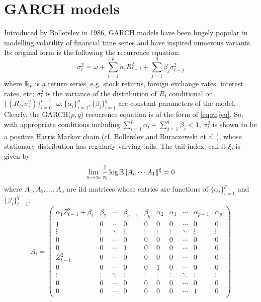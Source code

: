 
\section{GARCH models}
Introduced by Bollerslev in 1986, GARCH models have been hugely
popular in modelling volatility of financial time series and have
inspired numerous variants. Its original form is the following the
recurrence equation:
\[
\sigma_t^2 = \omega + \sum_{i=1}^p \alpha_i R_{t-i}^2 +
\sum_{j=1}^q \beta_j \sigma_{t-j}^2
\]
where $\mathbb{R}_t$ is a return series, e.g. stock returns, foreign exchange
rates, interest rates, etc; $\sigma_t^2$ is the variance of the
distribution of $R_t$ conditional on $\{(R_i,
\sigma_i^2)\}_{i=0}^{t-1}$. $\omega, \{\alpha_i\}_{i=1}^p,
\{\beta_i\}_{i=1}^q$ are constant parameters of the model. Clearly,
the GARCH($p,q$) recurrence equation is of the form of
\eqref{eq:rhjyu}. So, with appropriate conditions including
$\sum_{i=1}^p \alpha_i + \sum_{j=1}^q \beta_j < 1$, $\sigma_t^2$ is
shown to be a positive Harris Markov chain (cf. Bollerslev
\cite{bollerslev:1986} and Buraczewski et al
\cite{buraczewski:damek:mikosch:2016}), whose stationary distribution
has regularly varying tails. The tail index, call it $\xi$, is given by
\[
\lim_{n \to \infty} {1 \over n}\log\mathbb{E}\|A_n \cdots A_1\|^\xi = 0
\]
where $A_1, A_2, \dots, A_n$ are iid matrices whose entries are
functions of $\{\alpha_i\}_{i=1}^p$ and $\{\beta_i\}_{i=1}^q$:
\[
A_i =
\begin{pmatrix}
  \alpha_1 Z_{t-1}^2 + \beta_1 & \beta_2 & \cdots &
  \beta_{q-1} & \beta_q & \alpha_2 & \alpha_3 &
  \cdots & \alpha_{p-1} & \alpha_p\\
  1 & 0 & \cdots & 
  0 & 0 & 0 & 0 & \cdots & 0 & 0 \\
  \vdots & \vdots & \ddots & 
  \vdots & \vdots & \vdots & \vdots &
  \ddots & \vdots & \vdots \\
  0 & 0 & \cdots &
  0 & 0 & 0 & 0 & \cdots & 0 & 0 \\
  0 & 0 & \cdots &
  1 & 0 & 0 & 0 & \cdots & 0 & 0 \\
  Z_{t-1}^2 & 0 & \cdots &
  0 & 0 & 0 & 0 & \cdots & 0 & 0 \\
  0 & 0 & \cdots &
  0 & 0 & 1 & 0 & \cdots & 0 & 0 \\
  \vdots & \vdots & \ddots &
  \vdots & \vdots & \vdots & \vdots &
  \ddots & \vdots & \vdots \\
  0 & 0 & \cdots &
  0 & 0 & 0 & 0 & \cdots & 0 & 0 \\    
  0 & 0 & \cdots &
  0 & 0 & 0 & 0 & \cdots & 1 & 0 \\    
\end{pmatrix}
\]

